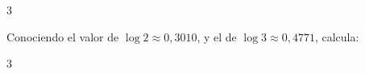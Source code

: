 \begin{questions}
\begin{multicols}{3}
    \end{multicols}

    \question
    Conociendo el valor de $\log 2 \approx 0,3010$, y el de $\log 3 \approx 0,4771$, calcula:
    \begin{multicols}{3}
    \end{multicols}


\end{questions}
